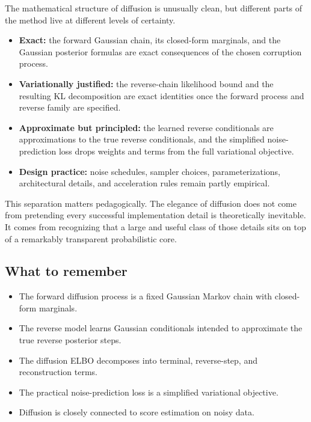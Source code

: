 The mathematical structure of diffusion is unusually clean, but different parts of the method live at different levels of certainty.

\begin{itemize}
    \item \textbf{Exact:} the forward Gaussian chain, its closed-form marginals, and the Gaussian posterior formulas are exact consequences of the chosen corruption process.
    \item \textbf{Variationally justified:} the reverse-chain likelihood bound and the resulting KL decomposition are exact identities once the forward process and reverse family are specified.
    \item \textbf{Approximate but principled:} the learned reverse conditionals are approximations to the true reverse conditionals, and the simplified noise-prediction loss drops weights and terms from the full variational objective.
    \item \textbf{Design practice:} noise schedules, sampler choices, parameterizations, architectural details, and acceleration rules remain partly empirical.
\end{itemize}

This separation matters pedagogically.
The elegance of diffusion does not come from pretending every successful implementation detail is theoretically inevitable.
It comes from recognizing that a large and useful class of those details sits on top of a remarkably transparent probabilistic core.

\subsection*{What to remember}

\begin{itemize}
    \item The forward diffusion process is a fixed Gaussian Markov chain with closed-form marginals.
    \item The reverse model learns Gaussian conditionals intended to approximate the true reverse posterior steps.
    \item The diffusion ELBO decomposes into terminal, reverse-step, and reconstruction terms.
    \item The practical noise-prediction loss is a simplified variational objective.
    \item Diffusion is closely connected to score estimation on noisy data.
\end{itemize}

